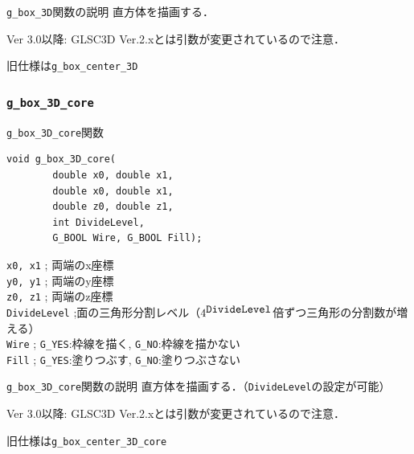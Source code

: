 \documentclass[platex,a4paper,12pt]{jsarticle}%
\begin{document}
\begin{itembox}[l]{\texttt{g\_box\_3D}関数の説明}
直方体を描画する．

Ver 3.0以降: GLSC3D Ver.2.xとは引数が変更されているので注意．

旧仕様は\verb|g_box_center_3D|
\end{itembox}

\subsubsection{\texttt{g\_box\_3D\_core}}

\begin{itembox}[l]{\texttt{g\_box\_3D\_core}関数}
\begin{verbatim}
void g_box_3D_core(
        double x0, double x1,
        double x0, double x1,
        double z0, double z1,
        int DivideLevel,
        G_BOOL Wire, G_BOOL Fill);   
\end{verbatim}
\verb|x0, x1| ; 両端のx座標\\
\verb|y0, y1| ; 両端のy座標\\
\verb|z0, z1| ; 両端のz座標\\
\verb|DivideLevel| ;面の三角形分割レベル（$4^{\verb|DivideLevel|}$倍ずつ三角形の分割数が増える）\\
\verb|Wire| ; \verb|G_YES|:枠線を描く, \verb|G_NO|:枠線を描かない \\
\verb|Fill| ; \verb|G_YES|:塗りつぶす, \verb|G_NO|:塗りつぶさない
\end{itembox}

\begin{itembox}[l]{\texttt{g\_box\_3D\_core}関数の説明}
直方体を描画する．（\verb|DivideLevel|の設定が可能）

Ver 3.0以降: GLSC3D Ver.2.xとは引数が変更されているので注意．

旧仕様は\verb|g_box_center_3D_core|
\end{itembox}



\clearpage
\end{document}
